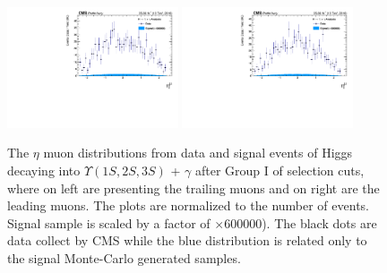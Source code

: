\begin{figure}[!htbp]
\begin{center}
\includegraphics[width=0.45\textwidth]{figures_and_tables/outputPlots/HtoUpsilon_Cat0_ZZZZZ/nEvts/data_x_mc/withKinCuts/h_withKin_TrailingMu_eta}\hspace*{1.cm}
\includegraphics[width=0.45\textwidth]{figures_and_tables/outputPlots/HtoUpsilon_Cat0_ZZZZZ/nEvts/data_x_mc/withKinCuts/h_withKin_LeadingMu_eta}
\end{center}\vspace*{-.5cm}
\caption{The $\eta$ muon distributions from data and signal events of Higgs decaying into $\Upsilon(1S,2S,3S)$ + $\gamma$ after Group I of selection cuts, where on left are presenting the trailing muons and on right are the leading muons. The plots are normalized to the number of events. Signal sample is scaled by a factor of $\times 600000$). The black dots are data collect by CMS while the blue distribution is related only to the signal Monte-Carlo generated samples.}
\label{fig:etaMuons_HtoUpsilon_Cat0_groupI_plus_II}
\end{figure}

